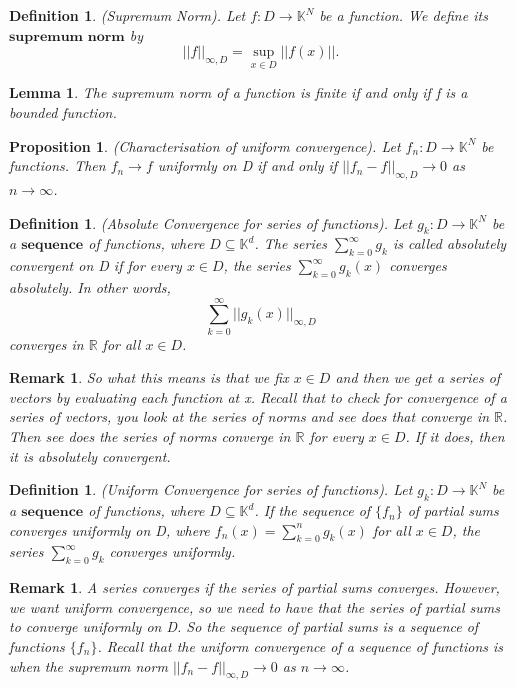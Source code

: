 \documentclass[twoside]{article}
\newtheorem{lemma}[theorem]{Lemma}
\newtheorem{proposition}[theorem]{Proposition}
\newtheorem{definition}[theorem]{Definition}
\newtheorem{remark}[theorem]{Remark}
\begin{document}
\begin{definition}(Supremum Norm). Let $f: D \rightarrow \mathbb{K}^N$ be a function. We define its $\textbf{supremum norm}$ by
$$
||f||_{\infty, D} = \sup_{x \in D}||f(x)||.
$$
\end{definition}

\begin{lemma}The supremum norm of a function is finite if and only if f is a bounded function.
\end{lemma}

\begin{proposition}(Characterisation of uniform convergence). Let $f_n: D \rightarrow \mathbb{K}^N$ be functions. Then $f_n \rightarrow f$ uniformly on D if and only if $||f_n - f||_{\infty, D} \rightarrow 0$ as $n \rightarrow \infty$.
\end{proposition}

\begin{definition}(Absolute Convergence for series of functions). Let $g_k: D \rightarrow \mathbb{K}^N$ be a $\textbf{sequence}$ of functions, where $D \subseteq \mathbb{K}^d$. The series $\sum_{k=0}^{\infty}g_k$ is called absolutely convergent on D if for every $x \in D$, the series $\sum_{k=0}^{\infty}g_k(x)$ converges absolutely. In other words,
$$
\sum_{k=0}^{\infty}||g_k(x)||_{\infty, D}
$$
converges in $\mathbb{R}$ for all $x \in D$.
\end{definition}

\begin{remark} So what this means is that we fix $x \in D$ and then we get a series of vectors by evaluating each function at x. Recall that to check for convergence of a series of vectors, you look at the series of norms and see does that converge in $\mathbb{R}$. Then see does the series of norms converge in $\mathbb{R}$ for every $x \in D$. If it does, then it is absolutely convergent.
\end{remark}

\begin{definition}(Uniform Convergence for series of functions). Let $g_k: D \rightarrow \mathbb{K}^N$ be a $\textbf{sequence}$ of functions, where $D \subseteq \mathbb{K}^d$. If the sequence of $\{f_n\}$ of partial sums converges uniformly on D, where $f_n(x) = \sum_{k=0}^{n}g_k(x)$ for all $x \in D$, the series $\sum_{k=0}^{\infty}g_k$ converges uniformly.
\end{definition}

\begin{remark} A series converges if the series of partial sums converges. However, we want uniform convergence, so we need to have that the series of partial sums to converge uniformly on D. So the sequence of partial sums is a sequence of functions $\{f_n\}$. Recall that the uniform convergence of a sequence of functions is when the supremum norm $||f_n - f||_{\infty,D} \rightarrow 0$ as $n \rightarrow \infty$.
\end{remark}
\end{document}
